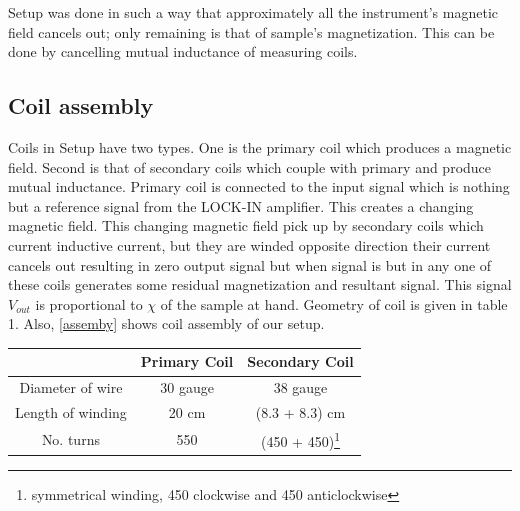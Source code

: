 Setup was done in such a way that approximately all the instrument's magnetic field cancels out; only remaining is that of sample’s magnetization.  This can be done by cancelling mutual inductance of measuring coils. 
\subsection{Coil assembly}
Coils in Setup have two types. One is the primary coil which produces a magnetic field. Second is that of secondary coils which couple with primary and produce mutual inductance. Primary coil is connected to the input signal which is nothing but a reference signal from the LOCK-IN amplifier. This creates a changing magnetic field. 
This changing magnetic field pick up by secondary coils which current inductive current, but they are winded opposite direction their current cancels out resulting in zero output signal but when signal is but in any one of these coils generates some residual magnetization and resultant signal. This signal $V_{out}$ is proportional to $\chi$ of the sample at hand. Geometry of coil is given in table 1. Also, \ref{assemby} shows coil assembly of our setup.

\noindent\setlength\tabcolsep{4pt}%
\begin{tabularx}{\linewidth}{|c|c|c|}
  \hline
  \hline
  & Primary Coil & Secondary Coil \\
  \hline
 Diameter of wire & 30 gauge & 38 gauge \\
 Length of winding & 20 cm & (8.3 + 8.3) cm \\
 No. turns & 550 & (450 + 450)\footnote{symmetrical winding, 450 clockwise and 450 anticlockwise}\\
 \hline
 \hline
\end{tabularx}
\label{geometry}
\vskip1cm


